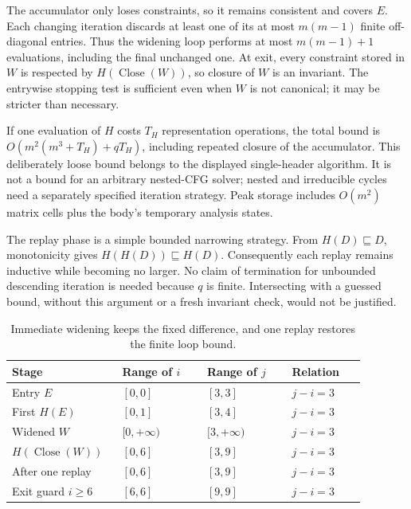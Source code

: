 The accumulator only loses constraints, so it remains consistent and covers $E$.
Each changing iteration discards at least one of its at most $m(m-1)$ finite off-diagonal entries.
Thus the widening loop performs at most $m(m-1)+1$ evaluations, including the final unchanged one.
At exit, every constraint stored in $W$ is respected by $H(\operatorname{Close}(W))$, so closure of $W$ is an invariant.
The entrywise stopping test is sufficient even when $W$ is not canonical; it may be stricter than necessary.

If one evaluation of $H$ costs $T_H$ representation operations, the total bound is $O(m^2(m^3+T_H)+qT_H)$, including repeated closure of the accumulator.
This deliberately loose bound belongs to the displayed single-header algorithm.
It is not a bound for an arbitrary nested-CFG solver; nested and irreducible cycles need a separately specified iteration strategy.
Peak storage includes $O(m^2)$ matrix cells plus the body's temporary analysis states.

The replay phase is a simple bounded narrowing strategy.
From $H(D)\sqsubseteq D$, monotonicity gives $H(H(D))\sqsubseteq H(D)$.
Consequently each replay remains inductive while becoming no larger.
No claim of termination for unbounded descending iteration is needed because $q$ is finite.
Intersecting with a guessed bound, without this argument or a fresh invariant check, would not be justified.

\begin{table}
\centering
\caption{Immediate widening keeps the fixed difference, and one replay restores the finite loop bound.}
\label{tab:ch43-loop}
\begin{tabular}{p{0.25\linewidth}p{0.22\linewidth}p{0.22\linewidth}p{0.19\linewidth}}
\toprule
Stage & Range of $i$ & Range of $j$ & Relation \\
\midrule
Entry $E$ & $[0,0]$ & $[3,3]$ & $j-i=3$ \\
First $H(E)$ & $[0,1]$ & $[3,4]$ & $j-i=3$ \\
Widened $W$ & $[0,+\infty)$ & $[3,+\infty)$ & $j-i=3$ \\
$H(\operatorname{Close}(W))$ & $[0,6]$ & $[3,9]$ & $j-i=3$ \\
After one replay & $[0,6]$ & $[3,9]$ & $j-i=3$ \\
Exit guard $i\geq6$ & $[6,6]$ & $[9,9]$ & $j-i=3$ \\
\bottomrule
\end{tabular}
\end{table}

